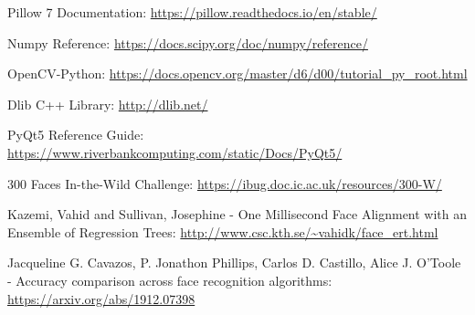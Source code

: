 \newpage
\begin{thebibliography}{9}
    Pillow 7 Documentation: \url{https://pillow.readthedocs.io/en/stable/}

    Numpy Reference: \url{https://docs.scipy.org/doc/numpy/reference/}
    
    OpenCV-Python: \url{https://docs.opencv.org/master/d6/d00/tutorial_py_root.html}
    
    Dlib C++ Library: \url{http://dlib.net/}
    
    PyQt5 Reference Guide: \url{https://www.riverbankcomputing.com/static/Docs/PyQt5/}

    300 Faces In-the-Wild Challenge: \url{https://ibug.doc.ic.ac.uk/resources/300-W/}

    Kazemi, Vahid and Sullivan, Josephine - One Millisecond Face Alignment with an Ensemble of Regression Trees:
    \url{http://www.csc.kth.se/~vahidk/face_ert.html}

    Jacqueline G. Cavazos, P. Jonathon Phillips, Carlos D. Castillo, Alice J. O'Toole - Accuracy comparison across face recognition algorithms:
    \url{https://arxiv.org/abs/1912.07398}

\end{thebibliography}